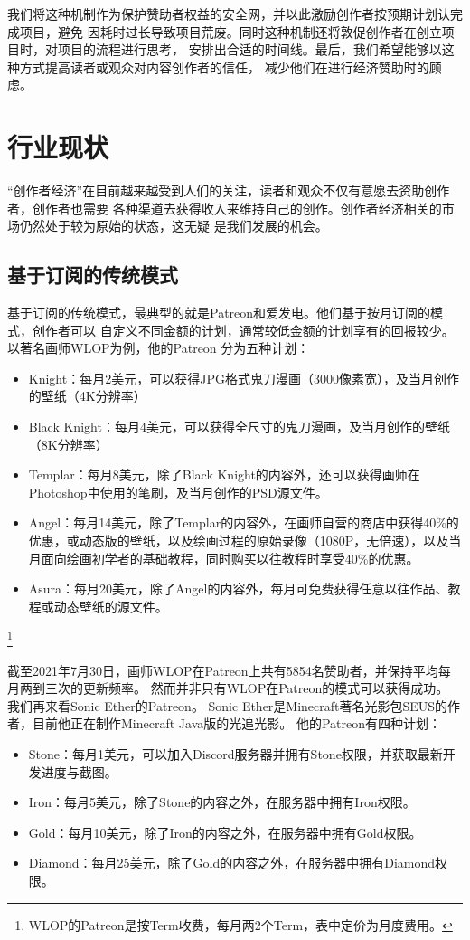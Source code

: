 \documentclass[11pt,UTF8,a4paper]{ctexart}
\begin{document}
    我们将这种机制作为保护赞助者权益的安全网，并以此激励创作者按预期计划认完成项目，避免
    因耗时过长导致项目荒废。同时这种机制还将敦促创作者在创立项目时，对项目的流程进行思考，
    安排出合适的时间线。最后，我们希望能够以这种方式提高读者或观众对内容创作者的信任，
    减少他们在进行经济赞助时的顾虑。


    \section{行业现状}\label{sec:now}

    “创作者经济”在目前越来越受到人们的关注，读者和观众不仅有意愿去资助创作者，创作者也需要
    各种渠道去获得收入来维持自己的创作。创作者经济相关的市场仍然处于较为原始的状态，这无疑
    是我们发展的机会。

    \subsection{基于订阅的传统模式}\label{subsec:tradition_patreon}

    基于订阅的传统模式，最典型的就是Patreon和爱发电。他们基于按月订阅的模式，创作者可以
    自定义不同金额的计划，通常较低金额的计划享有的回报较少。以著名画师WLOP为例，他的Patreon
    分为五种计划\cite{wlop_patreon}：
    \begin{itemize}
        \item Knight：每月2美元，可以获得JPG格式鬼刀漫画（3000像素宽），及当月创作的壁纸（4K分辨率）
        \item Black Knight：每月4美元，可以获得全尺寸的鬼刀漫画，及当月创作的壁纸（8K分辨率）
        \item Templar：每月8美元，除了Black Knight的内容外，还可以获得画师在Photoshop中使用的笔刷，及当月创作的PSD源文件。
        \item Angel：每月14美元，除了Templar的内容外，在画师自营的商店中获得40\%的优惠，或动态版的壁纸，以及绘画过程的原始录像（1080P，无倍速），以及当月面向绘画初学者的基础教程，同时购买以往教程时享受40\%的优惠。
        \item Asura：每月20美元，除了Angel的内容外，每月可免费获得任意以往作品、教程或动态壁纸的源文件。
    \end{itemize}\footnote{WLOP的Patreon是按Term收费，每月两2个Term，表中定价为月度费用。}

    截至2021年7月30日，画师WLOP在Patreon上共有5854名赞助者，并保持平均每月两到三次的更新频率。
    然而并非只有WLOP在Patreon的模式可以获得成功。 我们再来看Sonic Ether的Patreon。
    Sonic Ether是Minecraft著名光影包SEUS的作者，目前他正在制作Minecraft Java版的光追光影。
    他的Patreon有四种计划\cite{seus_patreon}：
    \begin{itemize}
        \item Stone：每月1美元，可以加入Discord服务器并拥有Stone权限，并获取最新开发进度与截图。
        \item Iron：每月5美元，除了Stone的内容之外，在服务器中拥有Iron权限。
        \item Gold：每月10美元，除了Iron的内容之外，在服务器中拥有Gold权限。
        \item Diamond：每月25美元，除了Gold的内容之外，在服务器中拥有Diamond权限。
    \end{itemize}
\end{document}

